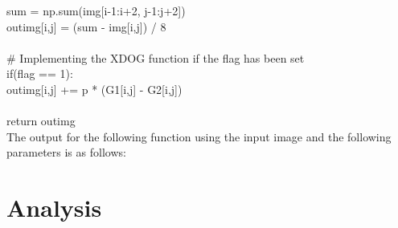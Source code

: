 \documentclass{article}
\begin{document}
	\indent \indent \indent \indent sum = np.sum(img[i-1:i+2, j-1:j+2])\\
	\indent \indent \indent \indent out\textunderscore img[i,j] = (sum - img[i,j]) / 8\\
	\\
	\indent \indent \indent \# Implementing the XDOG function if the flag has been set\\
	\indent \indent \indent if(flag == 1):\\
	\indent \indent \indent \indent out\textunderscore img[i,j] += p * (G1[i,j] - G2[i,j])\\
	\\
	\indent return out\textunderscore img\\
	
	The output for the following function using the input image and the following parameters is as follows:\\
	
	\section{Analysis}
	
\end{document}
